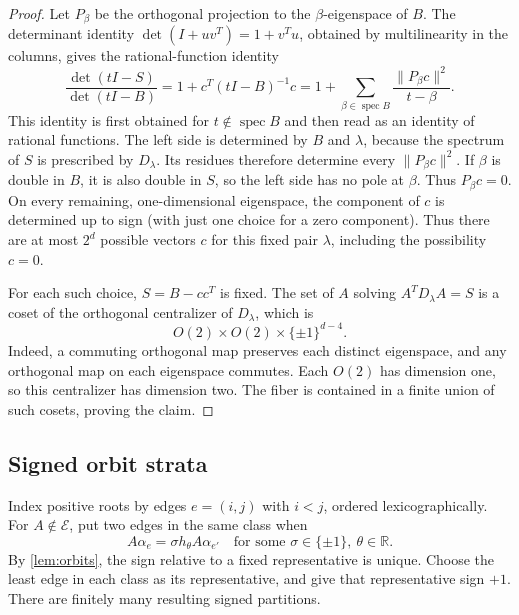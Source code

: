 \documentclass[11pt,reqno]{amsart}
\theoremstyle{definition}
\theoremstyle{remark}
\numberwithin{equation}{section}
\newcommand{\R}{\mathbb R}
\newcommand{\Exc}{\mathcal E}
\newcommand{\norm}[1]{\lVert #1\rVert}
\DeclareMathOperator{\spec}{spec}
\begin{document}
\begin{proof}
Let $P_\beta$ be the orthogonal projection to the $\beta$-eigenspace
of $B$. The determinant identity $\det(I+uv^T)=1+v^Tu$, obtained
by multilinearity in the columns, gives the rational-function identity
\begin{equation}\label{eq:secular}
 \frac{\det(tI-S)}{\det(tI-B)}
 =1+c^T(tI-B)^{-1}c
 =1+\sum_{\beta\in\spec B}
       \frac{\norm{P_\beta c}^2}{t-\beta}.
\end{equation}
This identity is first obtained for $t\notin\spec B$ and then read as
an identity of rational functions. The left side is determined by $B$
and $\lambda$, because the spectrum of $S$ is prescribed by
$D_\lambda$. Its residues therefore determine every
$\norm{P_\beta c}^2$.
If $\beta$ is double in $B$, it is also double in $S$, so the left
side has no pole at $\beta$. Thus $P_\beta c=0$. On every remaining,
one-dimensional eigenspace, the component of $c$ is determined up to sign (with just one choice for a zero component). Thus there are
at most $2^d$ possible vectors $c$ for this fixed pair $\lambda$,
including the possibility $c=0$.

For each such choice, $S=B-cc^T$ is fixed. The set of $A$ solving
$A^TD_\lambda A=S$ is a coset of the orthogonal centralizer of
$D_\lambda$, which is
\[
 O(2)\times O(2)\times\{\pm1\}^{d-4}.
\]
Indeed, a commuting orthogonal map preserves each distinct eigenspace,
and any orthogonal map on each eigenspace commutes. Each $O(2)$
has dimension one, so this centralizer has dimension two. The
fiber is contained in a finite union of such cosets, proving the
claim.
\end{proof}

\subsection{Signed orbit strata}
Index positive roots by edges $e=(i,j)$ with $i<j$, ordered
lexicographically.
For $A\notin\Exc$, put two edges in the same class when
\[
 A\alpha_e=\sigma h_\theta A\alpha_{e'}
 \quad\text{for some }\sigma\in\{\pm1\},\ \theta\in\R.
\]
By \cref{lem:orbits}, the sign relative to a fixed representative is
unique. Choose the least edge in each class as its representative,
and give that representative sign $+1$. There are finitely many
resulting signed partitions.
\end{document}
